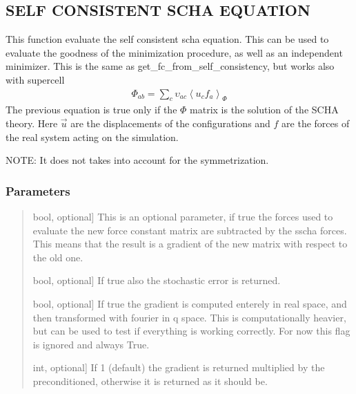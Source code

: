 \documentclass[a4paper,11pt,english]{sphinxmanual}
\begin{document}
\begin{fulllineitems}
\begin{fulllineitems}
\subsection{SELF CONSISTENT SCHA EQUATION}
\label{\detokenize{apireference:self-consistent-scha-equation}}
\sphinxAtStartPar
This function evaluate the self consistent scha equation. This can be used
to evaluate the goodness of the minimization procedure, as well as an
independent minimizer. This is the same as get\_fc\_from\_self\_consistency,
but works also with supercell
\begin{equation*}
\begin{split}\Phi_{ab} = \sum_c \upsilon_{ac} \left< u_c f_a\right>_{\Phi}\end{split}
\end{equation*}
\sphinxAtStartPar
The previous equation is true only if the \(\Phi\) matrix is the solution
of the SCHA theory. Here \(\vec u\) are the displacements of the configurations
and \(f\) are the forces of the real system acting on the simulation.

\sphinxAtStartPar
NOTE: It does not takes into account for the symmetrization.


\subsubsection{Parameters}
\label{\detokenize{apireference:id12}}\begin{quote}
\begin{description}
\sphinxlineitem{subtract\_sscha}{[}bool, optional{]}
\sphinxAtStartPar
This is an optional parameter, if true the forces used to evaluate the
new force constant matrix are subtracted by the sscha forces.
This means that the result is a gradient of the new matrix with respect
to the old one.

\sphinxlineitem{return\_error}{[}bool, optional{]}
\sphinxAtStartPar
If true also the stochastic error is returned.

\sphinxlineitem{use\_ups\_supercell}{[}bool, optional{]}
\sphinxAtStartPar
If true the gradient is computed enterely in real space, and then transformed
with fourier in q space. This is computationally heavier, but can be used
to test if everything is working correctly. For now this flag
is ignored and always True.

\sphinxlineitem{preconitioned}{[}int, optional{]}
\sphinxAtStartPar
If 1 (default) the gradient is returned multiplied by the preconditioned,
otherwise it is returned as it should be.


\end{description}
\end{quote}
\end{fulllineitems}
\end{fulllineitems}
\end{document}
